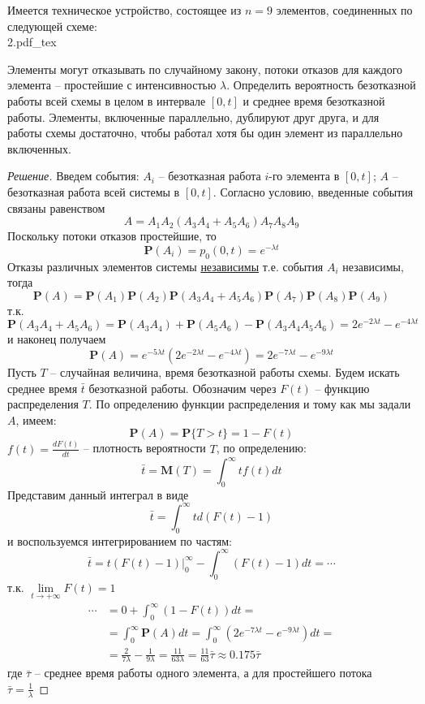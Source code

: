 \documentclass[12pt,a4paper]{article}
\newcommand{\incfig}[1]{%
	\def\svgwidth{\columnwidth}
	{#1.pdf_tex}
}
\newcommand{\pP}{\mathbf{P}}
\begin{document}
\begin{exercise}[Задача 4-1]
	Имеется техническое устройство, состоящее из $n=9$ элементов, соединенных по следующей схеме: \\
	
	\incfig{2}
	
	Элементы могут отказывать по случайному закону, потоки отказов для каждого элемента -- простейшие с интенсивностью $\lambda$. Определить вероятность безотказной работы всей схемы в целом в интервале $[0, t]$ и среднее время безотказной работы. Элементы, включенные параллельно, дублируют друг друга, и для работы схемы достаточно, чтобы работал хотя бы один элемент из параллельно включенных.
\end{exercise}
\begin{proof}[Решение]
	Введем события: $A_i$ -- безотказная работа $i$-го элемента в $[0, t]$; $A$ -- безотказная работа всей системы в $[0, t]$. Согласно условию, введенные события связаны равенством
	$$A = A_1 A_2 (A_3 A_4 + A_5 A_6) A_7 A_8 A_9$$
	Поскольку потоки отказов простейшие, то
	$$\pP(A_i) = p_0 (0, t) = e^{-\lambda t}$$
	Отказы различных элементов системы \underline{независимы} т.е. события $A_i$ независимы, тогда
	$$\pP(A) = \pP(A_1) \pP(A_2) \pP(A_3 A_4 + A_5 A_6) \pP(A_7) \pP(A_8) \pP(A_9)$$
	т.к. 
	$$\pP(A_3 A_4 + A_5 A_6) = \pP(A_3 A_4) + \pP(A_5 A_6) - \pP(A_3 A_4 A_5 A_6) = 2e^{-2\lambda t} - e^{-4\lambda t}$$
	и наконец получаем
	$$\pP(A) = e^{-5\lambda t}\left(2e^{-2\lambda t} - e^{-4\lambda t}\right) = 2e^{-7\lambda t} - e^{-9\lambda t}$$
	Пусть $T$ -- случайная величина, время безотказной работы схемы. Будем искать среднее время $\bar{t}$ безотказной работы. Обозначим через $F(t)$ -- функцию распределения $T$. По определению функции распределения и тому как мы задали $A$, имеем:
	$$\pP(A) = \pP\{T > t\} = 1 - F(t)$$
	$f(t) = \frac{dF (t)}{dt}$ -- плотность вероятности $T$, по определению:
	$$\bar{t} = \mathbf{M}(T) = \int_{0}^{\infty}{t f(t) dt}$$
	Представим данный интеграл в виде
	$$\bar{t} = \int_{0}^{\infty}{t d(F(t) - 1)}$$
	и воспользуемся интегрированием по частям:
	\begin{equation*}
		\bar{t} = t(F(t) - 1) \rvert_{0}^{\infty} - \int_{0}^{\infty}{(F(t) - 1)dt} = \cdots
	\end{equation*}
	т.к. $\lim\limits_{t \to +\infty}{F(t)} = 1$
	\begin{align*}
		\cdots &= 0 + \int_{0}^{\infty}{(1 - F(t))dt} = \\
				&= \int_{0}^{\infty}{\pP(A)dt} = \int_{0}^{\infty}{\left(2e^{-7\lambda t} - e^{-9\lambda t}\right) dt} = \\
				&= \frac{2}{7 \lambda} - \frac{1}{9 \lambda} = \frac{11}{63 \lambda} = \frac{11}{63}\bar{\tau} \approx 0.175\bar{\tau}
	\end{align*}
	где $\bar{\tau}$ -- среднее время работы одного элемента, а для простейшего потока \\ $\bar{\tau} = \frac{1}{\lambda}$
\end{proof}
\end{document}

